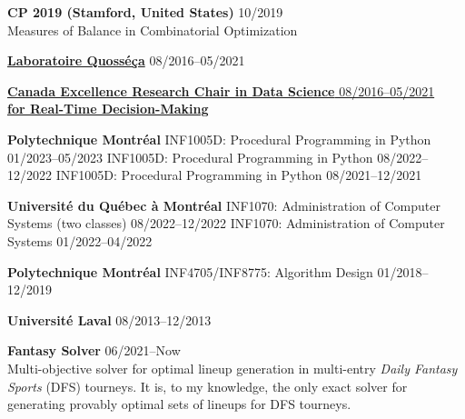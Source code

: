 \documentclass{memoir}
\begin{document}
\begin{list}{}


  \Item \textbf{CP 2019 (Stamford, United States)} \hfill 10/2019 \\
  Measures of Balance in Combinatorial Optimization



  \Item \href{https://www.polymtl.ca/labo-quosseca/en/members/alumni/doctoral-students}{\textbf{Laboratoire Quosséça}} \hfill 08/2016--05/2021

  \Item \href{http://cerc-datascience.polymtl.ca/person/philippe-olivier}{\textbf{Canada Excellence Research Chair in Data Science} \hfill 08/2016--05/2021 \\ \textbf{for Real-Time Decision-Making}} 




  \Item \textbf{Polytechnique Montréal}
  \BulletItem INF1005D: Procedural Programming in Python \hfill 01/2023--05/2023
  \BulletItem INF1005D: Procedural Programming in Python \hfill 08/2022--12/2022
  \BulletItem INF1005D: Procedural Programming in Python \hfill 08/2021--12/2021

  \Item \textbf{Université du Québec à Montréal}
  \BulletItem INF1070: Administration of Computer Systems (two classes) \hfill 08/2022--12/2022
  \BulletItem INF1070: Administration of Computer Systems \hfill 01/2022--04/2022



  \Item \textbf{Polytechnique Montréal}
  \BulletItem INF4705/INF8775: Algorithm Design \hfill 01/2018--12/2019

  \Item \textbf{Université Laval} \hfill 08/2013--12/2013



  \Item \textbf{Fantasy Solver} \hfill 06/2021--Now \\
  Multi-objective solver for optimal lineup generation in multi-entry \emph{Daily Fantasy Sports} (DFS) tourneys. It is, to my knowledge, the only exact solver for generating provably optimal sets of lineups for DFS tourneys.
  
\end{list}
\par
\end{document}
